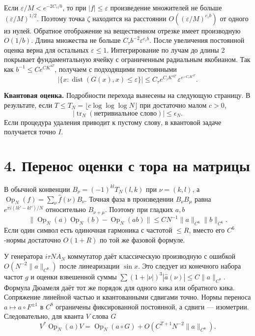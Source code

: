\documentclass[11pt,a4paper]{article}
\newcommand{\trn}{\operatorname{tr}_N}
\newcommand{\Op}{\operatorname{Op}}
\newcommand{\dist}{\operatorname{dist}}
\newcommand{\sect}[1]{\section*{\sffamily\color{ink}#1}}
\newcommand{\subt}[1]{\par\medskip\noindent\textbf{#1.}\quad}
\begin{document}
Если \(\varepsilon/M<e^{-2C_\tau/b}\), то при \(|f|\le\varepsilon\) произведение множителей не больше \((\varepsilon/M)^{1/2}\). Поэтому точка \(\zeta\) находится на расстоянии \(O((\varepsilon/M)^{c_\tau b})\) от одного из нулей. Обратное отображение на вещественном отрезке имеет производную \(O(1/b)\). Длина множества не больше \(C_\tau b^{-2}\varepsilon^{c_\tau b}\). После увеличения постоянной оценка верна для остальных \(\varepsilon\le1\). Интегрирование по лучам до длины 2 покрывает фундаментальную ячейку с ограниченным радиальным якобианом. Так как \(b^{-1}\le C e^{C K^{4T}}\), получаем с подходящими постоянными
\[
 \big|\{x:\dist(G(x),x)\le\varepsilon\}\big|
   \le C_\tau e^{C_\tau K^{4T}}\,
                    \varepsilon^{e^{-C_\tau K^{4T}}}.             \tag{3}
\]

\subt{Квантовая оценка}
Подробности перехода вынесены на следующую страницу. В результате, если
\(T\le T_N=\lfloor c\log\log\log N\rfloor\) при достаточно малом \(c>0\),
\[
     |\trn(\text{нетривиальное слово})|\le \epsilon_N .          \tag{4}
\]
Если процедура удаления приводит к пустому слову, в квантовой задаче получается точно \(I\).

\newpage
\sect{4. Перенос оценки с тора на матрицы}
В обычной конвенции \(B_\nu=(-1)^{kl}T_N(l,k)\) при \(\nu=(k,l)\), а
\(\Op_N(f)=\sum_\nu\widehat f(\nu)B_\nu\). Точная фаза в произведении \(B_\nu B_\mu\) равна \(e^{\pi i(l k'-k l')/N}\) относительно \(B_{\nu+\mu}\). Поэтому при гладких \(a,b\)
\[
  \|\Op_N(a)\Op_N(b)-\Op_N(ab)\|
        \le C N^{-1}\|a\|_{C^6}\|b\|_{C^6}.
\]
Если один символ есть одиночная гармоника с частотой \(\le R\), вместо его \(C^6\)-нормы достаточно \(O(1+R)\) по той же фазовой формуле.

У генератора \(i\tau N A_N\) коммутатор даёт классическую производную с ошибкой \(O(N^{-2}\|a\|_{C^8})\) после линеаризации \(\sin x\). Это следует из конечного набора частот \(g\) и оценки взвешенной суммы \(\sum(1+|\nu|)^3|\widehat a(\nu)|\le C\|a\|_{C^8}\). Формула Дюамеля даёт тот же порядок для одного кика или обратного кика. Сопряжение линейной частью и квантованными сдвигами точно. Нормы переноса \(a\mapsto a\circ F^{\pm1}\) в \(C^8\) ограничены фиксированной постоянной, а сдвиги — изометрии. Следовательно, для кванта \(V\) слова \(G\)
\[
       V^*\Op_N(a)V
           =\Op_N(a\circ G)+O(C^{T+1}N^{-2}\|a\|_{C^8}).
\]
\end{document}
